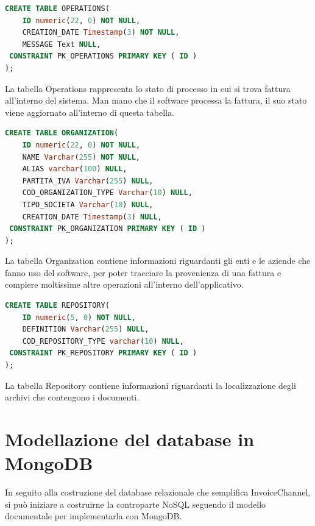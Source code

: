 \begin{lstlisting}[language=SQL,
        deletekeywords={IDENTITY,INT},
        morekeywords={clustered},    
        framesep=10pt,
        framextopmargin=10pt]
CREATE TABLE OPERATIONS(
    ID numeric(22, 0) NOT NULL,
    CREATION_DATE Timestamp(3) NOT NULL,
    MESSAGE Text NULL,
 CONSTRAINT PK_OPERATIONS PRIMARY KEY ( ID )
);
\end{lstlisting}
\noindent La tabella Operations rappresenta lo stato di processo in cui si trova fattura all'interno del sistema. Man mano che il software processa la fattura, il suo stato viene aggiornato all'interno di questa tabella.\\

\begin{lstlisting}[language=SQL,
        deletekeywords={IDENTITY,INT},
        morekeywords={clustered},    
        framesep=10pt,
        framextopmargin=10pt]
CREATE TABLE ORGANIZATION(
    ID numeric(22, 0) NOT NULL,
    NAME Varchar(255) NOT NULL,
    ALIAS varchar(100) NULL,
    PARTITA_IVA Varchar(255) NULL,
    COD_ORGANIZATION_TYPE Varchar(10) NULL,
    TIPO_SOCIETA Varchar(10) NULL,
    CREATION_DATE Timestamp(3) NULL,
 CONSTRAINT PK_ORGANIZATION PRIMARY KEY ( ID )
);
\end{lstlisting}
\noindent La tabella Organization contiene informazioni riguardanti gli enti e le aziende che fanno uso del software, per poter tracciare la provenienza di una fattura e compiere moltissime altre operazioni all'interno dell'applicativo.\\

\begin{lstlisting}[language=SQL,
        deletekeywords={IDENTITY,INT},
        morekeywords={clustered},    
        framesep=10pt,
        framextopmargin=10pt]
CREATE TABLE REPOSITORY(
    ID numeric(5, 0) NOT NULL,
    DEFINITION Varchar(255) NULL,
    COD_REPOSITORY_TYPE varchar(10) NULL,
 CONSTRAINT PK_REPOSITORY PRIMARY KEY ( ID )
);
\end{lstlisting}
\noindent La tabella Repository contiene informazioni riguardanti la localizzazione degli archivi che contengono i documenti. \\


\section{Modellazione del database in MongoDB}
In seguito alla costruzione del database relazionale che semplifica InvoiceChannel, si può iniziare a costruirne la controparte NoSQL seguendo il modello documentale per implementarla con MongoDB.\\

